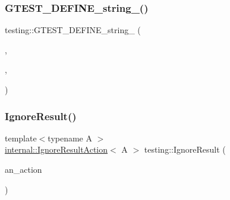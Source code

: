 \subsubsection{\texorpdfstring{GTEST\_DEFINE\_string\_()}{GTEST\_DEFINE\_string\_()}\hspace{0.1cm}{\footnotesize\ttfamily [5/5]}}
{\footnotesize\ttfamily testing\+::\+G\+T\+E\+S\+T\+\_\+\+D\+E\+F\+I\+N\+E\+\_\+string\+\_\+ (\begin{DoxyParamCaption}\item[{stream\+\_\+result\+\_\+to}]{,  }\item[{\mbox{\hyperlink{namespacetesting_1_1internal_a7ed785df46a339403b0f749d3a879201}{internal\+::\+String\+From\+G\+Test\+Env}}(\char`\"{}stream\+\_\+result\+\_\+to\char`\"{}, \char`\"{}\char`\"{})}]{,  }\item[{\char`\"{}This flag specifies the host name and the port number on which to stream \char`\"{} \char`\"{}\mbox{\hyperlink{_mutual_8h_a707ee03719e99670bf6cfdfd897b8456}{test}} results. Example\+: \textbackslash{}\char`\"{}localhost\+:555\textbackslash{}\char`\"{}. The flag is effective only on \char`\"{} \char`\"{}Linux.\char`\"{}}]{ }\end{DoxyParamCaption})}

\mbox{\label{namespacetesting_a257c9395b54e9267a0348a6310128889}} 
\subsubsection{\texorpdfstring{IgnoreResult()}{IgnoreResult()}}
{\footnotesize\ttfamily template$<$typename A $>$ \\
\mbox{\hyperlink{classtesting_1_1internal_1_1_ignore_result_action}{internal\+::\+Ignore\+Result\+Action}}$<$ A $>$ testing\+::\+Ignore\+Result (\begin{DoxyParamCaption}\item[{const A \&}]{an\+\_\+action }\end{DoxyParamCaption})\hspace{0.3cm}{\ttfamily [inline]}}

\mbox{\label{namespacetesting_a32b1c6db9ba5133ccabfa67616b3c041}} 
